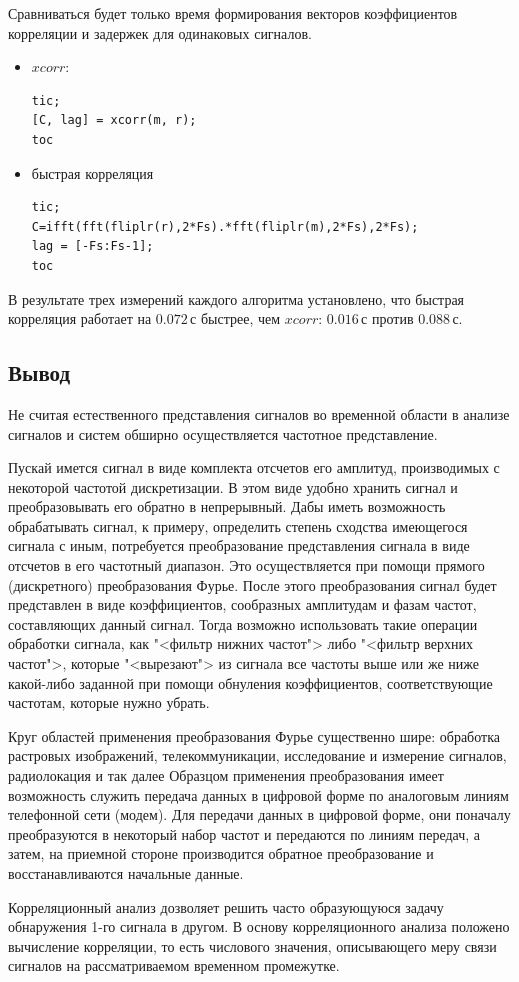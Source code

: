 \documentclass[12pt,a4paper]{article}
\begin{document}
Сравниваться будет только время формирования векторов коэффициентов корреляции и задержек для одинаковых сигналов.
\begin{itemize}
\item $xcorr$:
\begin{verbatim}
tic;
[C, lag] = xcorr(m, r);
toc
\end{verbatim}
\item быстрая корреляция
\begin{verbatim}
tic;
C=ifft(fft(fliplr(r),2*Fs).*fft(fliplr(m),2*Fs),2*Fs);
lag = [-Fs:Fs-1]; 
toc
\end{verbatim} 
\end{itemize}

В результате трех измерений каждого алгоритма установлено, что быстрая корреляция работает на $0.072$\,с быстрее, чем $xcorr$: $0.016$\,с против $0.088$\,с.

\subsection{Вывод}

Не считая естественного представления сигналов во временной области в анализе сигналов и систем обширно осуществляется частотное представление.

Пускай имется сигнал в виде комплекта отсчетов его амплитуд, производимых с некоторой частотой дискретизации. В этом виде удобно хранить сигнал и преобразовывать его обратно в непрерывный. Дабы иметь возможность обрабатывать сигнал, к примеру, определить степень сходства имеющегося сигнала с иным, потребуется преобразование представления сигнала в виде отсчетов в его частотный диапазон. Это осуществляется при помощи прямого (дискретного) преобразования Фурье. После этого преобразования сигнал будет представлен в виде коэффициентов, сообразных амплитудам и фазам частот, составляющих данный сигнал. Тогда возможно использовать такие операции обработки сигнала, как "<фильтр нижних частот"> либо "<фильтр верхних частот">, которые "<вырезают"> из сигнала все частоты выше или же ниже какой-либо заданной при помощи обнуления коэффициентов, соответствующие частотам, которые нужно убрать.

Круг областей применения преобразования Фурье существенно шире: обработка растровых изображений, телекоммуникации, исследование и измерение сигналов, радиолокация и так далее Образцом применения преобразования имеет возможность служить передача данных в цифровой форме по аналоговым линиям телефонной сети (модем). Для передачи данных в цифровой форме, они поначалу преобразуются в некоторый набор частот и передаются по линиям передач, а затем, на приемной стороне производится обратное преобразование и восстанавливаются начальные данные. 

Корреляционный анализ дозволяет решить часто образующуюся задачу обнаружения 1-го сигнала в другом. В основу корреляционного анализа положено вычисление корреляции, то есть
числового значения, описывающего меру связи сигналов на рассматриваемом временном промежутке. 
\end{document}
